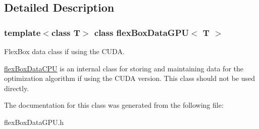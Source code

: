 \subsection{Detailed Description}
\subsubsection*{template$<$class T$>$\newline
class flex\+Box\+Data\+G\+P\+U$<$ T $>$}

Flex\+Box data class if using the C\+U\+DA. 

\hyperlink{classflex_box_data_c_p_u}{flex\+Box\+Data\+C\+PU} is an internal class for storing and maintaining data for the optimization algorithm if using the C\+U\+DA version. This class should not be used directly. 

The documentation for this class was generated from the following file\+:\begin{DoxyCompactItemize}
\item 
flex\+Box\+Data\+G\+P\+U.\+h\end{DoxyCompactItemize}

